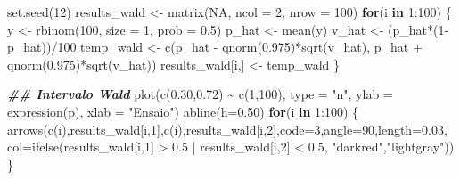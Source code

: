 \documentclass[
  10pt,
  a4paper]{book}
\newenvironment{Shaded}{\begin{snugshade}}{\end{snugshade}}
\newcommand{\AttributeTok}[1]{\textcolor[rgb]{0.77,0.63,0.00}{#1}}
\newcommand{\ConstantTok}[1]{\textcolor[rgb]{0.00,0.00,0.00}{#1}}
\newcommand{\ControlFlowTok}[1]{\textcolor[rgb]{0.13,0.29,0.53}{\textbf{#1}}}
\newcommand{\DecValTok}[1]{\textcolor[rgb]{0.00,0.00,0.81}{#1}}
\newcommand{\DocumentationTok}[1]{\textcolor[rgb]{0.56,0.35,0.01}{\textbf{\textit{#1}}}}
\newcommand{\FloatTok}[1]{\textcolor[rgb]{0.00,0.00,0.81}{#1}}
\newcommand{\FunctionTok}[1]{\textcolor[rgb]{0.00,0.00,0.00}{#1}}
\newcommand{\NormalTok}[1]{#1}
\newcommand{\OtherTok}[1]{\textcolor[rgb]{0.56,0.35,0.01}{#1}}
\newcommand{\SpecialCharTok}[1]{\textcolor[rgb]{0.00,0.00,0.00}{#1}}
\newcommand{\StringTok}[1]{\textcolor[rgb]{0.31,0.60,0.02}{#1}}
\begin{document}
\begin{Shaded}
\begin{Highlighting}[]
\FunctionTok{set.seed}\NormalTok{(}\DecValTok{12}\NormalTok{)}
\NormalTok{results\_wald }\OtherTok{\textless{}{-}} \FunctionTok{matrix}\NormalTok{(}\ConstantTok{NA}\NormalTok{, }\AttributeTok{ncol =} \DecValTok{2}\NormalTok{, }\AttributeTok{nrow =} \DecValTok{100}\NormalTok{)}
\ControlFlowTok{for}\NormalTok{(i }\ControlFlowTok{in} \DecValTok{1}\SpecialCharTok{:}\DecValTok{100}\NormalTok{) \{}
\NormalTok{  y }\OtherTok{\textless{}{-}} \FunctionTok{rbinom}\NormalTok{(}\DecValTok{100}\NormalTok{, }\AttributeTok{size =} \DecValTok{1}\NormalTok{, }\AttributeTok{prob =} \FloatTok{0.5}\NormalTok{)}
\NormalTok{  p\_hat }\OtherTok{\textless{}{-}} \FunctionTok{mean}\NormalTok{(y)}
\NormalTok{  v\_hat }\OtherTok{\textless{}{-}}\NormalTok{ (p\_hat}\SpecialCharTok{*}\NormalTok{(}\DecValTok{1}\SpecialCharTok{{-}}\NormalTok{p\_hat))}\SpecialCharTok{/}\DecValTok{100}
\NormalTok{  temp\_wald }\OtherTok{\textless{}{-}} \FunctionTok{c}\NormalTok{(p\_hat }\SpecialCharTok{{-}}  \FunctionTok{qnorm}\NormalTok{(}\FloatTok{0.975}\NormalTok{)}\SpecialCharTok{*}\FunctionTok{sqrt}\NormalTok{(v\_hat), p\_hat }\SpecialCharTok{+} \FunctionTok{qnorm}\NormalTok{(}\FloatTok{0.975}\NormalTok{)}\SpecialCharTok{*}\FunctionTok{sqrt}\NormalTok{(v\_hat))}
\NormalTok{  results\_wald[i,] }\OtherTok{\textless{}{-}}\NormalTok{ temp\_wald}
\NormalTok{\}}

\DocumentationTok{\#\# Intervalo Wald}
\FunctionTok{plot}\NormalTok{(}\FunctionTok{c}\NormalTok{(}\FloatTok{0.30}\NormalTok{,}\FloatTok{0.72}\NormalTok{) }\SpecialCharTok{\textasciitilde{}} \FunctionTok{c}\NormalTok{(}\DecValTok{1}\NormalTok{,}\DecValTok{100}\NormalTok{), }\AttributeTok{type =} \StringTok{"n"}\NormalTok{, }\AttributeTok{ylab =} \FunctionTok{expression}\NormalTok{(p), }\AttributeTok{xlab =} \StringTok{"Ensaio"}\NormalTok{)}
\FunctionTok{abline}\NormalTok{(}\AttributeTok{h=}\FloatTok{0.50}\NormalTok{)}
\ControlFlowTok{for}\NormalTok{(i }\ControlFlowTok{in} \DecValTok{1}\SpecialCharTok{:}\DecValTok{100}\NormalTok{) \{}
  \FunctionTok{arrows}\NormalTok{(}\FunctionTok{c}\NormalTok{(i),results\_wald[i,}\DecValTok{1}\NormalTok{],}\FunctionTok{c}\NormalTok{(i),results\_wald[i,}\DecValTok{2}\NormalTok{],}\AttributeTok{code=}\DecValTok{3}\NormalTok{,}\AttributeTok{angle=}\DecValTok{90}\NormalTok{,}\AttributeTok{length=}\FloatTok{0.03}\NormalTok{,}
         \AttributeTok{col=}\FunctionTok{ifelse}\NormalTok{(results\_wald[i,}\DecValTok{1}\NormalTok{] }\SpecialCharTok{\textgreater{}} \FloatTok{0.5} \SpecialCharTok{|}\NormalTok{ results\_wald[i,}\DecValTok{2}\NormalTok{] }\SpecialCharTok{\textless{}} \FloatTok{0.5}\NormalTok{, }\StringTok{"darkred"}\NormalTok{,}\StringTok{"lightgray"}\NormalTok{))}
\NormalTok{\}}
\end{Highlighting}
\end{Shaded}
\end{document}
